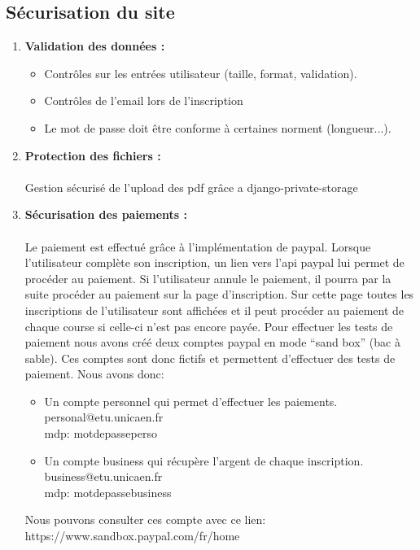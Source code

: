 \documentclass[12pt]{article} %
\begin{document}
	\subsection{Sécurisation du site}
        \begin{enumerate}
            \item \textbf{Validation des données :}
            \begin{itemize}
                \item Contrôles sur les entrées utilisateur (taille, format, validation).
                \item Contrôles de l'email lors de l'inscription
                \item Le mot de passe doit être conforme à certaines norment (longueur...).
            \end{itemize}
            \item \textbf{Protection des fichiers :}\\ \\
                Gestion sécurisé de l'upload des pdf grâce a django-private-storage
            \item \textbf{Sécurisation des paiements :}\\ \\
                Le paiement est effectué grâce à l'implémentation de paypal. Lorsque l'utilisateur complète son inscription, un lien vers l’api paypal lui permet de procéder au paiement. Si l'utilisateur annule le paiement, il pourra par la suite procéder au paiement sur la page d’inscription. Sur cette page toutes les inscriptions de l'utilisateur sont affichées et il peut procéder au paiement de chaque course si celle-ci n'est pas encore payée. Pour effectuer les tests de paiement nous avons créé deux comptes paypal en mode “sand box” (bac à sable). Ces comptes sont donc fictifs et permettent d'effectuer des tests de paiement. Nous avons donc:\\
                \begin{itemize}
                \item Un compte personnel qui permet d'effectuer les paiements.\\
                personal@etu.unicaen.fr\\
                mdp: motdepasseperso\\
                \item Un compte business qui récupère l’argent de chaque inscription.\\
                business@etu.unicaen.fr\\
                mdp: motdepassebusiness\\
                \end{itemize}
                Nous pouvons consulter ces compte avec ce lien:\\  https://www.sandbox.paypal.com/fr/home\\

        \end{enumerate}
\end{document}
